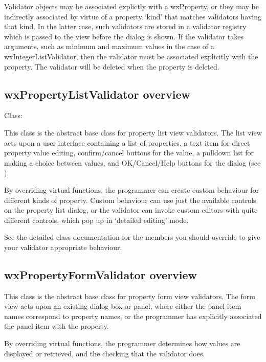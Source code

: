 Validator objects may be associated explictly with a wxProperty, or they may be
indirectly associated by virtue of a property `kind' that matches validators having
that kind. In the latter case, such validators are stored in a validator registry
which is passed to the view before the dialog is shown. If the validator takes
arguments, such as minimum and maximum values in the case of a wxIntegerListValidator,
then the validator must be associated explicitly with the property. The validator
will be deleted when the property is deleted.

\subsection{wxPropertyListValidator overview}\label{wxpropertylistvalidatoroverview}

Class: 

This class is the abstract base class for property list view validators.
The list view acts upon a user interface containing a list of properties,
a text item for direct property value editing, confirm/cancel buttons for the value,
a pulldown list for making a choice between values, and OK/Cancel/Help buttons
for the dialog (see ).

By overriding virtual functions, the programmer can create custom
behaviour for different kinds of property. Custom behaviour can use just the
available controls on the property list dialog, or the validator can
invoke custom editors with quite different controls, which pop up in
`detailed editing' mode.

See the detailed class documentation for the members you should override
to give your validator appropriate behaviour.

\subsection{wxPropertyFormValidator overview}\label{wxpropertyformvalidatoroverview}

This class is the abstract base class for property form view validators.
The form view acts upon an existing dialog box or panel, where either the
panel item names correspond to property names, or the programmer has explicitly
associated the panel item with the property.

By overriding virtual functions, the programmer determines how
values are displayed or retrieved, and the checking that the validator does.

